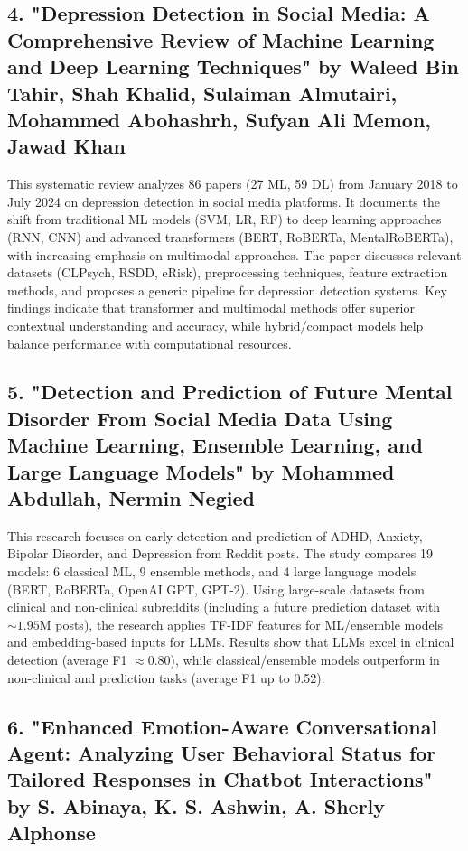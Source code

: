 \documentclass[11pt]{report}
\begin{document}
\subsection{4. "Depression Detection in Social Media: A Comprehensive Review of Machine Learning and Deep Learning Techniques" by Waleed Bin Tahir, Shah Khalid, Sulaiman Almutairi, Mohammed Abohashrh, Sufyan Ali Memon, Jawad Khan \cite{4}}

This systematic review analyzes 86 papers (27 ML, 59 DL) from January 2018 to July 2024 on depression detection in social media platforms. It documents the shift from traditional ML models (SVM, LR, RF) to deep learning approaches (RNN, CNN) and advanced transformers (BERT, RoBERTa, MentalRoBERTa), with increasing emphasis on multimodal approaches. The paper discusses relevant datasets (CLPsych, RSDD, eRisk), preprocessing techniques, feature extraction methods, and proposes a generic pipeline for depression detection systems. Key findings indicate that transformer and multimodal methods offer superior contextual understanding and accuracy, while hybrid/compact models help balance performance with computational resources.

\subsection{5. "Detection and Prediction of Future Mental Disorder From Social Media Data Using Machine Learning, Ensemble Learning, and Large Language Models" by Mohammed Abdullah, Nermin Negied \cite{5}}

This research focuses on early detection and prediction of ADHD, Anxiety, Bipolar Disorder, and Depression from Reddit posts. The study compares 19 models: 6 classical ML, 9 ensemble methods, and 4 large language models (BERT, RoBERTa, OpenAI GPT, GPT-2). Using large-scale datasets from clinical and non-clinical subreddits (including a future prediction dataset with $\sim 1.95$M posts), the research applies TF-IDF features for ML/ensemble models and embedding-based inputs for LLMs. Results show that LLMs excel in clinical detection (average F1 $\approx 0.80$), while classical/ensemble models outperform in non-clinical and prediction tasks (average F1 up to 0.52).

\subsection{6. "Enhanced Emotion-Aware Conversational Agent: Analyzing User Behavioral Status for Tailored Responses in Chatbot Interactions" by S. Abinaya, K. S. Ashwin, A. Sherly Alphonse \cite{6}}
\end{document}
